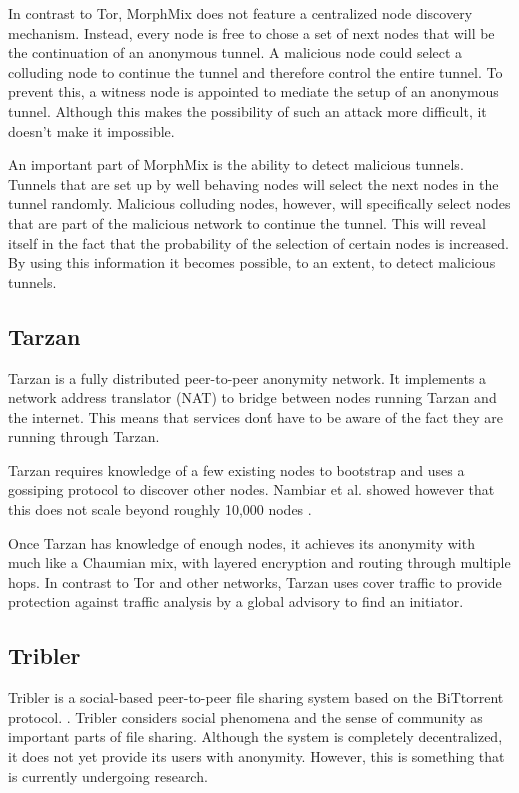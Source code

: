 \documentclass{article}
\begin{document}
		In contrast to Tor, MorphMix does not feature a centralized node discovery mechanism. Instead, every node is free to chose a set of next nodes that will be the continuation of an anonymous tunnel. A malicious node could select a colluding node to continue the tunnel and therefore control the entire tunnel. To prevent this, a witness node is appointed to mediate the setup of an anonymous tunnel. Although this makes the possibility of such an attack more difficult, it doesn't make it impossible.
		
		An important part of MorphMix is the ability to detect malicious tunnels. Tunnels that are set up by well behaving nodes will select the next nodes in the tunnel randomly. Malicious colluding nodes, however, will specifically select nodes that are part of the malicious network to continue the tunnel. This will reveal itself in the fact that the probability of the selection of certain nodes is increased. By using this information it becomes possible, to an extent, to detect malicious tunnels.
		
	\subsection{Tarzan} %
		Tarzan \cite{freedman2002tarzan} is a fully distributed peer-to-peer anonymity network. It implements a network address translator (NAT) to bridge between nodes running Tarzan and the internet. This means that services don\'t have to be aware of the fact they are running through Tarzan.
		
		Tarzan requires knowledge of a few existing nodes to bootstrap and uses a gossiping protocol to discover other nodes. Nambiar et al. showed however that this does not scale beyond roughly 10,000 nodes \cite{panchenko2009nisan, nambiar2006salsa}.
		
		Once Tarzan has knowledge of enough nodes, it achieves its anonymity with much like a Chaumian mix, with layered encryption and routing through multiple hops. In contrast to Tor and other networks, Tarzan uses cover traffic to provide protection against traffic analysis by a global advisory to find an initiator.
		
	\subsection{Tribler} %
		Tribler is a social-based peer-to-peer file sharing system based on the BiTtorrent protocol. \cite{pouwelse2008tribler}. Tribler considers social phenomena and the sense of community as important parts of file sharing. Although the system is completely decentralized, it does not yet provide its users with anonymity. However, this is something that is currently undergoing research.
		
\end{document}
